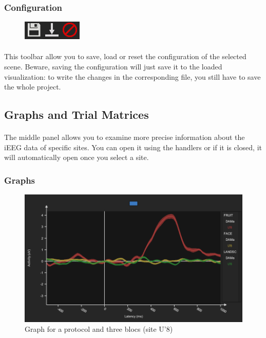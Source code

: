 \documentclass[a4paper]{article}
\begin{document}
\subsubsection{Configuration}
\begin{figure}[H]
\begin{center}
\includegraphics[scale=0.5]{Configuration.png}
\end{center}
\end{figure}
\paragraph{} This toolbar allow you to save, load or reset the configuration of the selected scene. Beware, saving the configuration will just save it to the loaded visualization: to write the changes in the corresponding file, you still have to save the whole project.
\subsection{Graphs and Trial Matrices}\label{graphs}
\paragraph{} The middle panel allows you to examine more precise information about the iEEG data of specific sites. You can open it using the handlers or if it is closed, it will automatically open once you select a site.
\subsubsection{Graphs}
\begin{figure}[H]
\begin{center}
\includegraphics[scale=0.35]{Graph.png}
\end{center}
\caption{\label{graph}Graph for a protocol and three blocs (site U'8)}
\end{figure}
\end{document}
